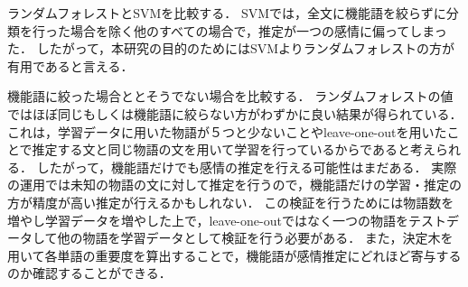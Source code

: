 ランダムフォレストとSVMを比較する．
SVMでは，全文に機能語を絞らずに分類を行った場合を除く他のすべての場合で，推定が一つの感情に偏ってしまった．
したがって，本研究の目的のためにはSVMよりランダムフォレストの方が有用であると言える．

機能語に絞った場合ととそうでない場合を比較する．
ランダムフォレストの値ではほぼ同じもしくは機能語に絞らない方がわずかに良い結果が得られている．
これは，学習データに用いた物語が５つと少ないことやleave-one-outを用いたことで推定する文と同じ物語の文を用いて学習を行っているからであると考えられる．
したがって，機能語だけでも感情の推定を行える可能性はまだある．
実際の運用では未知の物語の文に対して推定を行うので，機能語だけの学習・推定の方が精度が高い推定が行えるかもしれない．
この検証を行うためには物語数を増やし学習データを増やした上で，leave-one-outではなく一つの物語をテストデータして他の物語を学習データとして検証を行う必要がある．
また，決定木を用いて各単語の重要度を算出することで，機能語が感情推定にどれほど寄与するのか確認することができる．



